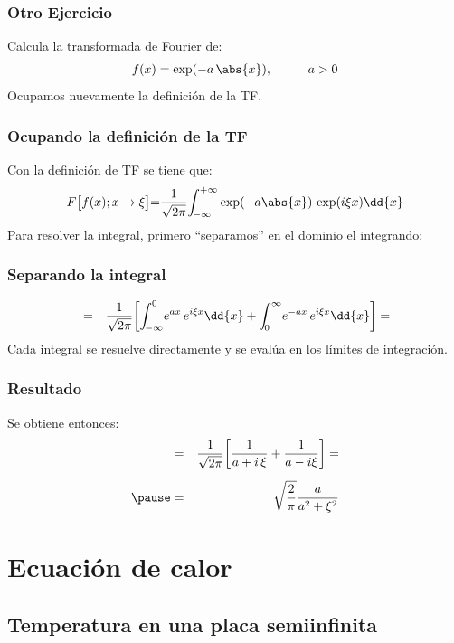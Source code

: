\begin{frame}
\frametitle{Otro Ejercicio}
Calcula la transformada de Fourier de:
\begin{align*}
f(x) = \exp(-a \, \abs{x}), \hspace{1cm} a > 0
\end{align*}
\pause
Ocupamos nuevamente la definición de la TF.
\end{frame}
\begin{frame}
\frametitle{Ocupando la definición de la TF}
Con la definición de TF se tiene que:
\pause
\begin{align*}
F \big[ f(x); x \to \xi \big] {=} \dfrac{1}{\sqrt{2 \pi}} \scaleint{5ex}_{\bs -\infty}^{+\infty} \exp(-a \abs{x}) \, \exp(i \xi x) \dd{x}
\end{align*}
Para resolver la integral, primero \enquote{separamos} en el dominio el integrando:
\end{frame}
\begin{frame}
\frametitle{Separando la integral}
\begin{eqnarray*}
&=& \dfrac{1}{\sqrt{2 \pi}} \bigg[ \scaleint{5ex}_{\bs -\infty}^{0} e^{ a  x} \, e^{i \xi x} \dd{x} + \scaleint{5ex}_{\bs 0}^{\infty} e^{ -a  x} \, e^{i \xi x} \dd{x} \bigg] =
\end{eqnarray*}
\pause
Cada integral se resuelve directamente y se evalúa en los límites de integración.
\end{frame}
\begin{frame}
\frametitle{Resultado}
Se obtiene entonces:
\pause
\begin{eqnarray*}
&=& \dfrac{1}{\sqrt{2 \pi}} \bigg[ \dfrac{1}{a + i \, \xi} + \dfrac{1}{a - i \xi} \bigg] = \\[0.5em] \pause
&=& \sqrt{\dfrac{2}{\pi}} \dfrac{a}{a^{2} + \xi^{2}}
\end{eqnarray*}
\end{frame}

\section{Ecuación de calor}
\subsection{Temperatura en una placa semiinfinita}

